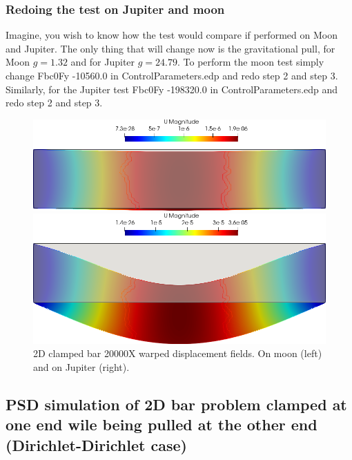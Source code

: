 \subsubsection{Redoing the test on Jupiter and moon}

Imagine, you wish to know how the test would compare if performed on Moon and Jupiter. The only thing that will change now is the gravitational pull, for Moon $g=1.32$ and for Jupiter $g=24.79$. To perform the moon test simply change  {\ttfamily Fbc0Fy -10560.0} in {\ttfamily ControlParameters.edp} and redo step 2 and step 3. Similarly, for the Jupiter test {\ttfamily Fbc0Fy -198320.0} in {\ttfamily ControlParameters.edp} and redo step 2 and step 3.

\begin{figure}[htbp]
    \centering
    \begin{minipage}[t][2.5cm][t]{0.4\textwidth}
    \includegraphics[align=t,width=1\textwidth]{./Images/2d-bar-moon.png}
    \end{minipage}\hspace{.1\textwidth}
    \begin{minipage}[t][2.5cm][t]{0.4\textwidth}
    \includegraphics[align=t,width=1\textwidth]{./Images/2d-bar-Jupiter.png}
    \end{minipage}
    \caption{2D clamped bar 20000X warped displacement fields. On moon (left) and  on Jupiter (right).}
    \label{fig:moon-jupiter}
\end{figure}

\subsection{PSD simulation of 2D bar problem clamped at one end wile being pulled at the other end (Dirichlet-Dirichlet case)\label{sec:2d-bar-clamped2}}

